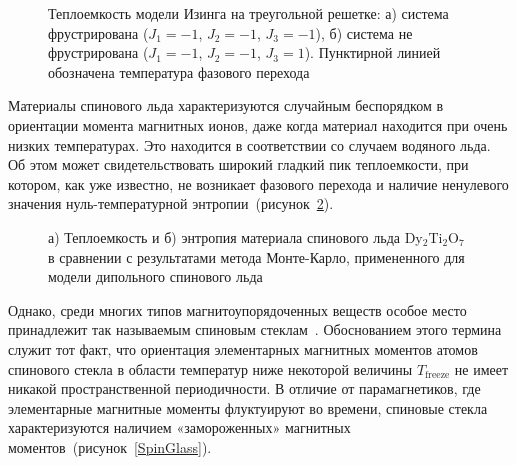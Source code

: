  \begin{figure}[h]
 	\begin{minipage}[h]{0.49\linewidth}
 	\end{minipage}
 	\hfill
 	\begin{minipage}[h]{0.49\linewidth}
 	\end{minipage}
 	\caption{Теплоемкость модели Изинга на треугольной решетке: а) система фрустрирована ($J_1 = -1$, $J_2 = -1$, $J_3 = -1$), б) система не фрустрирована ($J_1 = -1$, $J_2 = -1$, $J_3 = 1$). Пунктирной линией обозначена температура фазового перехода}
 	\label{heatTriangleExpl}
 \end{figure}

Материалы спинового льда характеризуются случайным беспорядком в ориентации момента магнитных ионов, даже когда материал находится при очень низких температурах. Это находится в соответствии со случаем водяного льда. Об этом может свидетельствовать широкий гладкий пик теплоемкости, при котором, как уже известно, не возникает фазового перехода и наличие ненулевого значения нуль-температурной энтропии~(рисунок~\ref{HeatAndEntropyExpl}). 

 \begin{figure}[h]
 	\begin{minipage}[h]{0.49\linewidth}
 	\end{minipage}
 	\hfill
 	\begin{minipage}[h]{0.49\linewidth}
 	\end{minipage}
 	\caption{а) Теплоемкость и б) энтропия материала спинового льда Dy$_2$Ti$_2$O$_7$ в сравнении с результатами метода Монте-Карло, примененного для модели дипольного спинового льда~\cite{bramwell2001}}
 	\label{HeatAndEntropyExpl}
 \end{figure}

Однако, среди многих типов магнитоупорядоченных веществ особое место принадлежит так называемым спиновым стеклам~\cite{diep2013,docenko1993}.  Обоснованием этого термина служит тот факт, что ориентация элементарных магнитных моментов атомов спинового стекла в области температур ниже некоторой величины $T_{\text{freeze}}$ не имеет никакой пространственной периодичности. В
отличие от парамагнетиков, где элементарные магнитные моменты флуктуируют во времени, спиновые стекла характеризуются наличием «замороженных» магнитных моментов~(рисунок~\ref{SpinGlass}).

